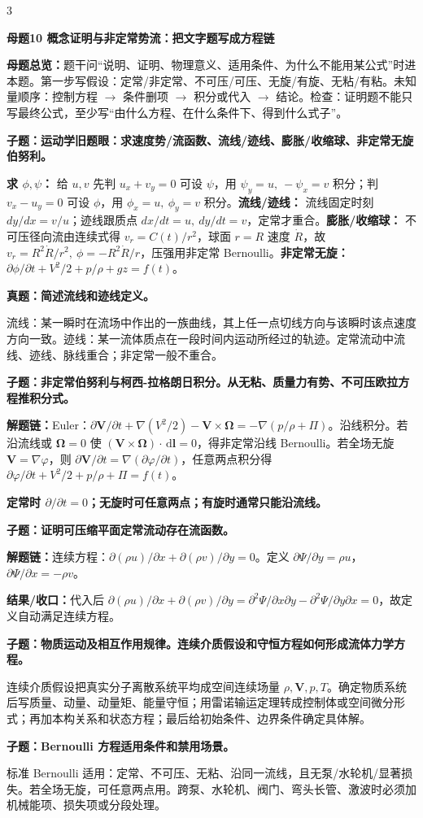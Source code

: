 \documentclass[a4paper]{article}
\newcommand{\mt}[1]{\vspace{0.22pt}\colorbox{M}{\parbox{\dimexpr\linewidth-2\fboxsep}{\color{white}\bfseries #1}}\par}
\newcommand{\qt}[1]{\vspace{0.10pt}\colorbox{Q}{\parbox{\dimexpr\linewidth-2\fboxsep}{\color{white}\bfseries #1}}\par}
\newcommand{\ans}[1]{\colorbox{G}{\parbox{\dimexpr\linewidth-2\fboxsep}{#1}}\par}
\newcommand{\warn}[1]{\colorbox{Y}{\parbox{\dimexpr\linewidth-2\fboxsep}{\color{E}\bfseries #1}}\par}
\newcommand{\chain}[1]{{\color{A}\bfseries 解题链：}#1\par}
\newcommand{\res}[1]{{\color{E}\bfseries 结果/收口：}#1\par}
\newcommand{\dd}{\,\mathrm d}
\newcommand{\mview}[1]{\ans{\textbf{母题总览：}#1}}
\begin{document}
\begin{multicols}{3}
\mt{母题10 概念证明与非定常势流：把文字题写成方程链}
\mview{题干问“说明、证明、物理意义、适用条件、为什么不能用某公式”时进本题。第一步写假设：定常/非定常、不可压/可压、无旋/有旋、无粘/有粘。未知量顺序：控制方程 $\to$ 条件删项 $\to$ 积分或代入 $\to$ 结论。检查：证明题不能只写最终公式，至少写“由什么方程、在什么条件下、得到什么式子”。}
\qt{子题：运动学旧题眼：求速度势/流函数、流线/迹线、膨胀/收缩球、非定常无旋伯努利。}
\ans{\textbf{求 $\phi,\psi$：} 给 $u,v$ 先判 $u_x+v_y=0$ 可设 $\psi$，用 $\psi_y=u,\ -\psi_x=v$ 积分；判 $v_x-u_y=0$ 可设 $\phi$，用 $\phi_x=u,\ \phi_y=v$ 积分。\textbf{流线/迹线：} 流线固定时刻 $dy/dx=v/u$；迹线跟质点 $dx/dt=u,\ dy/dt=v$，定常才重合。\textbf{膨胀/收缩球：} 不可压径向流由连续式得 $v_r=C(t)/r^2$，球面 $r=R$ 速度 $\dot R$，故 $v_r=R^2\dot R/r^2,\ \phi=-R^2\dot R/r$，压强用非定常 Bernoulli。\textbf{非定常无旋：} $\partial\phi/\partial t+V^2/2+p/\rho+gz=f(t)$。}
\qt{真题：简述流线和迹线定义。}
\ans{流线：某一瞬时在流场中作出的一族曲线，其上任一点切线方向与该瞬时该点速度方向一致。迹线：某一流体质点在一段时间内运动所经过的轨迹。定常流动中流线、迹线、脉线重合；非定常一般不重合。}

\qt{子题：非定常伯努利与柯西-拉格朗日积分。从无粘、质量力有势、不可压欧拉方程推积分式。}
\chain{Euler：$\partial\bm V/\partial t+\nabla(V^2/2)-\bm V\times\bm\Omega=-\nabla(p/\rho+\Pi)$。沿线积分。若沿流线或 $\bm\Omega=0$ 使 $(\bm V\times\bm\Omega)\cdot\dd\bm l=0$，得非定常沿线 Bernoulli。若全场无旋 $\bm V=\nabla\varphi$，则 $\partial\bm V/\partial t=\nabla(\partial\varphi/\partial t)$，任意两点积分得 $\partial\varphi/\partial t+V^2/2+p/\rho+\Pi=f(t)$。}
\warn{定常时 $\partial/\partial t=0$；无旋时可任意两点；有旋时通常只能沿流线。}

\qt{子题：证明可压缩平面定常流动存在流函数。}
\chain{连续方程：$\partial(\rho u)/\partial x+\partial(\rho v)/\partial y=0$。定义 $\partial\Psi/\partial y=\rho u$，$\partial\Psi/\partial x=-\rho v$。}
\res{代入后 $\partial(\rho u)/\partial x+\partial(\rho v)/\partial y=\partial^2\Psi/\partial x\partial y-\partial^2\Psi/\partial y\partial x=0$，故定义自动满足连续方程。}

\qt{子题：物质运动及相互作用规律。连续介质假设和守恒方程如何形成流体力学方程。}
\ans{连续介质假设把真实分子离散系统平均成空间连续场量 $\rho,\bm V,p,T$。确定物质系统后写质量、动量、动量矩、能量守恒；用雷诺输运定理转成控制体或空间微分形式；再加本构关系和状态方程；最后给初始条件、边界条件确定具体解。}

\qt{子题：Bernoulli 方程适用条件和禁用场景。}
\ans{标准 Bernoulli 适用：定常、不可压、无粘、沿同一流线，且无泵/水轮机/显著损失。若全场无旋，可任意两点用。跨泵、水轮机、阀门、弯头长管、激波时必须加机械能项、损失项或分段处理。}


\end{multicols}
\end{document}
